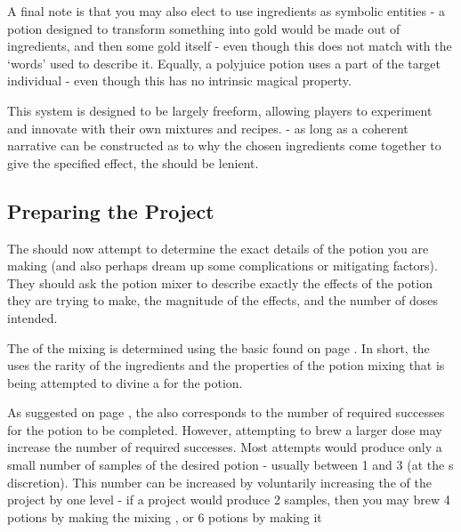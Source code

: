 A final note is that you may also elect to use ingredients as symbolic entities - a potion designed to transform something into gold would be made out of  ingredients, and then some gold itself - even though this does not match with the `words' used to describe it. Equally, a polyjuice potion uses a part of the target individual - even though this has no intrinsic magical property. 

This system is designed to be largely freeform, allowing players to experiment and innovate with their own mixtures and recipes. - as long as a coherent narrative can be constructed as to why the chosen ingredients come together to give the specified effect, the  should be lenient.


\subsection{Preparing the Project}

The  should now attempt to determine the exact details of the potion you are making (and also perhaps dream up some complications or mitigating factors). They should ask the potion mixer to describe exactly the effects of the potion they are trying to make, the magnitude of the effects, and the number of doses intended. 

The  of the mixing is determined using the basic  found on page \pageref{T:ArtificingDV}. In short, the  uses the rarity of the ingredients and the properties of the potion mixing that is being attempted to divine a  for the potion.

As suggested on page \pageref{T:ArtificingDV}, the  also corresponds to the number of required successes for the potion to be completed. However, attempting to brew a larger dose may increase the number of required successes. Most  attempts would produce only a small number of samples of the desired potion - usually between 1 and 3 (at the s discretion). This number can be increased by voluntarily increasing the  of the project by one level - if a  project would produce 2 samples, then you may brew 4 potions by making the mixing , or 6 potions by making it 



